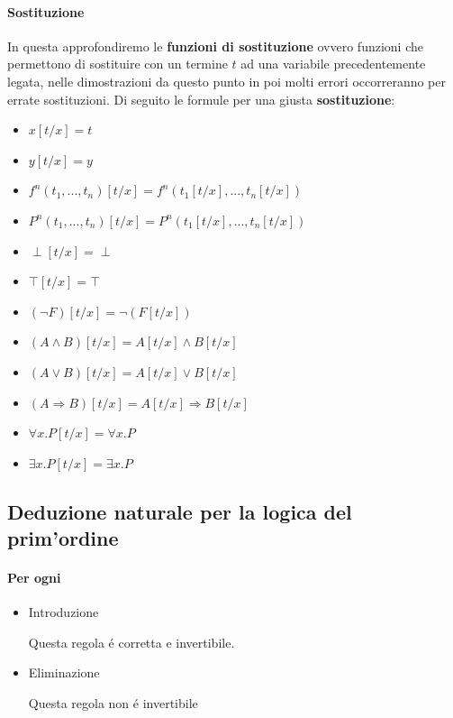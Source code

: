 \documentclass{article}
\begin{document}
\paragraph{Sostituzione}
In questa approfondiremo le \textbf{funzioni di sostituzione} ovvero funzioni che permettono di sostituire con un termine $t$ ad una variabile precedentemente legata, nelle dimostrazioni da questo punto in poi molti errori occorreranno per errate sostituzioni. Di seguito le formule per una giusta \textbf{sostituzione}:
\begin{itemize}
    \item $x[t/x]=t$
    \item $y[t/x]=y$
    \item $f^n(t_1,...,t_n)[t/x]=f^n(t_1[t/x],...,t_n[t/x])$
    \item $P^n(t_1,...,t_n)[t/x]=P^n(t_1[t/x],...,t_n[t/x])$
    \item $\perp[t/x]=\perp$
    \item $\top[t/x]=\top$
    \item $(\neg F)[t/x]=\neg(F[t/x])$
    \item $(A\land B)[t/x]=A[t/x]\land B[t/x]$
    \item $(A\lor B)[t/x]=A[t/x]\lor B[t/x]$
    \item $(A\Rightarrow B)[t/x]=A[t/x]\Rightarrow B[t/x]$
    \item $\forall x.P[t/x]=\forall x.P$
    \item $\exists  x.P[t/x]=\exists x.P$
\end{itemize}
\subsection{Deduzione naturale per la logica del prim'ordine}
\paragraph{Per ogni}
\begin{itemize}
    \item Introduzione \begin{mathpar}
    \end{mathpar}
    Questa regola é corretta e invertibile.
    \item Eliminazione \begin{mathpar}
    \end{mathpar}
    Questa regola non é invertibile
\end{itemize}
\end{document}
